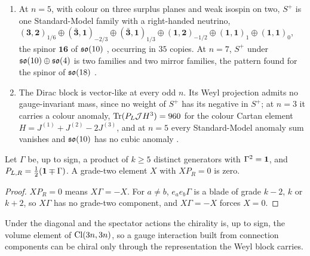 \begin{proposition}
\begin{enumerate}[label=(\roman*),leftmargin=2.2em]
a triplet with $q=\tfrac12$ and a singlet with $q=-\tfrac32$, so that with $\BmL=\tfrac23q$ the triplet has $\BmL=\tfrac13$ and the singlet $-1$:
lepton number as the fourth colour \cite{PatiSalam}. The eight gluons are neutral, the six remaining generators of $\so6$ carry $q=\pm2$ and turn
the triplet into the singlet, as leptoquark bosons do. The copy $\so3$ acts on the Dirac block with Casimir $6$, that is isospin two: it is not weak
isospin.
\item At $n=5$, with colour on three surplus planes and weak isospin on two, $S^+$ is one Standard-Model family with a right-handed neutrino,
$(\mathbf3,\mathbf2)_{1/6}\oplus(\bar{\mathbf3},\mathbf1)_{-2/3}\oplus(\bar{\mathbf3},\mathbf1)_{1/3}\oplus(\mathbf1,\mathbf2)_{-1/2}\oplus(\mathbf1,\mathbf1)_1\oplus(\mathbf1,\mathbf1)_0$,
the spinor $\mathbf{16}$ of $\mathfrak{so}(10)$ \cite{FritzschMinkowski,Slansky}, occurring in $35$ copies. At $n=7$, $S^+$ under $\mathfrak{so}(10)\oplus\mathfrak{so}(4)$ is two
families and two mirror families, the pattern found for the spinor of $\mathfrak{so}(18)$ \cite{WilczekZee}.
\item The Dirac block is vector-like at every odd $n$. Its Weyl projection admits no gauge-invariant mass, since no weight of $S^+$ has its negative in
$S^+$; at $n=3$ it carries a colour anomaly, $\operatorname{Tr}(P_L\mathcal JH^3)=960$ for the colour Cartan element $H=J^{(1)}+J^{(2)}-2J^{(3)}$, and at $n=5$ every
Standard-Model anomaly sum vanishes and $\mathfrak{so}(10)$ has no cubic anomaly \cite{GeorgiGlashow72}.
\end{enumerate}
\end{proposition}

\begin{lemma}
\label{lem:nochiral}
Let $\Gamma$ be, up to sign, a product of $k\ge5$ distinct generators with $\Gamma^2=\mathbf 1$, and $P_{L,R}=\tfrac12(\mathbf 1\mp\Gamma)$. A grade-two element $X$
with $XP_R=0$ is zero.
\end{lemma}

\begin{proof}
$XP_R=0$ means $X\Gamma=-X$. For $a\neq b$, $e_ae_b\Gamma$ is a blade of grade $k-2$, $k$ or $k+2$, so $X\Gamma$ has no grade-two component, and
$X\Gamma=-X$ forces $X=0$.
\end{proof}

Under the diagonal and the spectator actions the chirality is, up to sign, the volume element of $\mathrm{Cl}(3n,3n)$, so a gauge interaction built from
connection components can be chiral only through the representation the Weyl block carries.


